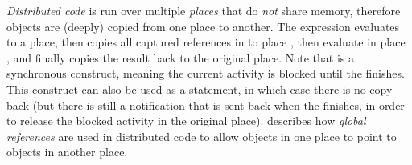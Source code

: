 \emph{Distributed code} is run over multiple \emph{places} that do \emph{not} share memory,
    therefore objects are (deeply) copied from one place to another.
The expression  evaluates  to a place, then copies all captured references in  to place ,
    then evaluate  in place , and finally copies the result back to the original place.
Note that  is a synchronous construct, meaning the current activity is blocked until the  finishes.
This construct can also be used as a statement, in which case there is no copy back
    (but there is still a notification that is sent back when the  finishes, in order to release the blocked activity in the original place).
 describes how \emph{global references} are used in distributed code
    to allow objects in one place to point to objects in another place.





